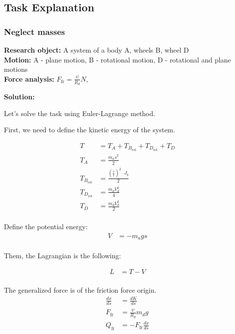 \documentclass{article}
\begin{document}
\subsection{Task Explanation}

\subsubsection{Neglect masses}

\textbf{Research object:} A system of a body A, wheels B, wheel D\\
\textbf{Motion:} A - plane motion, B - rotational motion, D - rotational and plane motions\\
\textbf{Force analysis:} $F_\text{fr} = \frac{\psi}{R_d} N$, 


\textbf{Solution:}

Let's solve the task using Euler-Lagrange method. 

First, we need to define the kinetic energy of the system. 

\begin{align*}
  T &= T_A + T_{B_{\text{rot}}} + T_{D_{\text{rot}}} + T_D \\
  T_A &= \frac{m_a \dot{s}^2}{2} \\
  T_{B_{\text{rot}}} &= \frac{(\frac{\dot{s}}{r})^2 \cdot J_b}{2} \\
  T_{D_{\text{rot}}} &= \frac{m_d V_d^2}{4} \\
  T_D &= \frac{m_d V_d^2}{2} \\
\end{align*}
  
Define the potential energy:
\begin{align*}
  V &= -m_a g s \\
\end{align*}

Them, the Lagrangian is the following:

\begin{align*}
  L &= T - V \\
\end{align*}

The generalized force is of the friction force origin. 
\begin{align*}
  \frac{dx}{ds} &= \frac{dK}{ds} \\
  F_{\text{fr}} &= \frac{\psi}{R_d} m_d g \\
  Q_{\text{fr}} &= -F_{\text{fr}} \frac{dx}{ds} \\
\end{align*}
\end{document}
